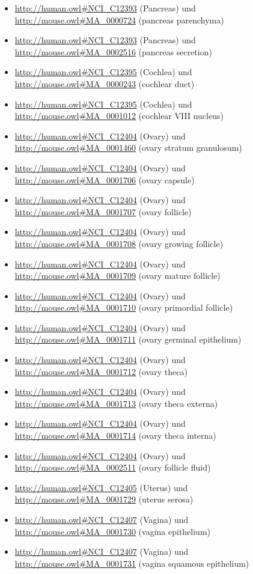 \begin{itemize}
	\item \url{http://human.owl#NCI_C12393} (Pancreas) und \url{http://mouse.owl#MA_0000724} (pancreas parenchyma)
	\item \url{http://human.owl#NCI_C12393} (Pancreas) und \url{http://mouse.owl#MA_0002516} (pancreas secretion)
	\item \url{http://human.owl#NCI_C12395} (Cochlea) und \url{http://mouse.owl#MA_0000243} (cochlear duct)
	\item \url{http://human.owl#NCI_C12395} (Cochlea) und \url{http://mouse.owl#MA_0001012} (cochlear VIII nucleus)
	\item \url{http://human.owl#NCI_C12404} (Ovary) und \url{http://mouse.owl#MA_0001460} (ovary stratum granulosum)
	\item \url{http://human.owl#NCI_C12404} (Ovary) und \url{http://mouse.owl#MA_0001706} (ovary capsule)
	\item \url{http://human.owl#NCI_C12404} (Ovary) und \url{http://mouse.owl#MA_0001707} (ovary follicle)
	\item \url{http://human.owl#NCI_C12404} (Ovary) und \url{http://mouse.owl#MA_0001708} (ovary growing follicle)
	\item \url{http://human.owl#NCI_C12404} (Ovary) und \url{http://mouse.owl#MA_0001709} (ovary mature follicle)
	\item \url{http://human.owl#NCI_C12404} (Ovary) und \url{http://mouse.owl#MA_0001710} (ovary primordial follicle)
	\item \url{http://human.owl#NCI_C12404} (Ovary) und \url{http://mouse.owl#MA_0001711} (ovary germinal epithelium)
	\item \url{http://human.owl#NCI_C12404} (Ovary) und \url{http://mouse.owl#MA_0001712} (ovary theca)
	\item \url{http://human.owl#NCI_C12404} (Ovary) und \url{http://mouse.owl#MA_0001713} (ovary theca externa)
	\item \url{http://human.owl#NCI_C12404} (Ovary) und \url{http://mouse.owl#MA_0001714} (ovary theca interna)
	\item \url{http://human.owl#NCI_C12404} (Ovary) und \url{http://mouse.owl#MA_0002511} (ovary follicle fluid)
	\item \url{http://human.owl#NCI_C12405} (Uterus) und \url{http://mouse.owl#MA_0001729} (uterus serosa)
	\item \url{http://human.owl#NCI_C12407} (Vagina) und \url{http://mouse.owl#MA_0001730} (vagina epithelium)
	\item \url{http://human.owl#NCI_C12407} (Vagina) und \url{http://mouse.owl#MA_0001731} (vagina squamous epithelium)

\end{itemize}
